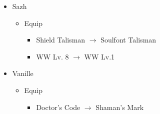 \begin{menu}
\begin{itemize}
\begin{itemize}
			\end{itemize}
			\equip
			\begin{itemize}
				\item Sazh
				      \begin{itemize}
					      \item Equip
					            \begin{itemize}
						            \item Shield Talisman $\rightarrow$ Soulfont Talisman
						            \item WW Lv. 8 $\rightarrow$ WW Lv.1
					            \end{itemize}
				      \end{itemize}
				\item Vanille
				      \begin{itemize}
					      \item Equip
					            \begin{itemize}
						            \item Doctor's Code $\rightarrow$ Shaman's Mark
					            \end{itemize}
				      \end{itemize}
			\end{itemize}
		\end{itemize}
	\end{menu}
	\vfill
